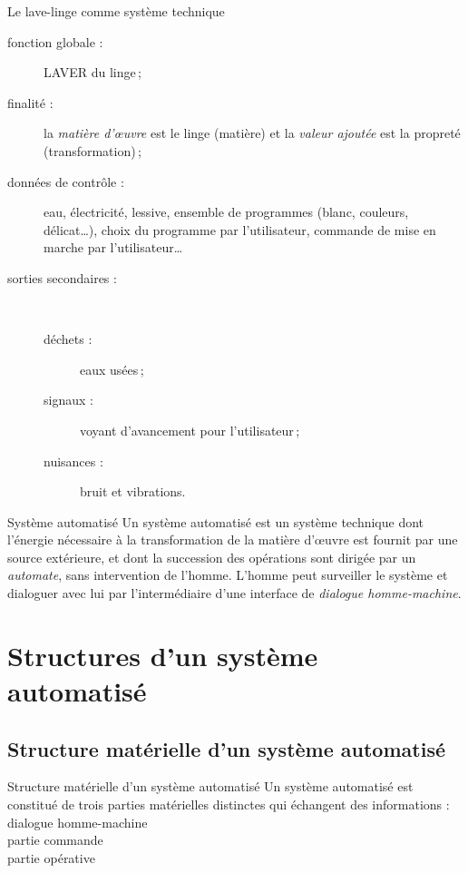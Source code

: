 \begin{exemple}{Le lave-linge comme système technique}{}
\begin{description}
\item [fonction globale :] LAVER du linge\,;
\item [finalité :] la \emph{matière d'\oe{}uvre} est le linge (matière) et la \emph{valeur ajoutée} est la propreté (transformation)\,;
\item [données de contrôle :] eau, électricité, lessive, ensemble de programmes (blanc, couleurs, délicat\ldots), choix du programme par l'utilisateur, commande de mise en marche par l'utilisateur\ldots
\item [sorties secondaires :] ~
\begin{description}
\item [déchets :] eaux usées\,;
\item [signaux :] voyant d'avancement pour l'utilisateur\,;
\item [nuisances :] bruit et vibrations.
\end{description}
\end{description}
\end{exemple}

\begin{definition}{Système automatisé}{}
Un système automatisé est un système technique dont l'énergie nécessaire à la transformation de la matière d'\oe{}uvre est fournit par une source extérieure, et dont la succession des opérations sont dirigée par un \emph{automate}, sans intervention de l'homme. L'homme peut surveiller le système et dialoguer avec lui par l'intermédiaire d'une interface de \emph{dialogue homme-machine}.
\end{definition}

\section{Structures d'un système automatisé}

\subsection{Structure matérielle d'un système automatisé}

\begin{definition}{Structure matérielle d'un système automatisé}{}
Un système automatisé est constitué de trois parties matérielles distinctes qui échangent des informations :\\
 dialogue homme-machine\\
 partie commande\\
 partie opérative\\
\end{definition}

